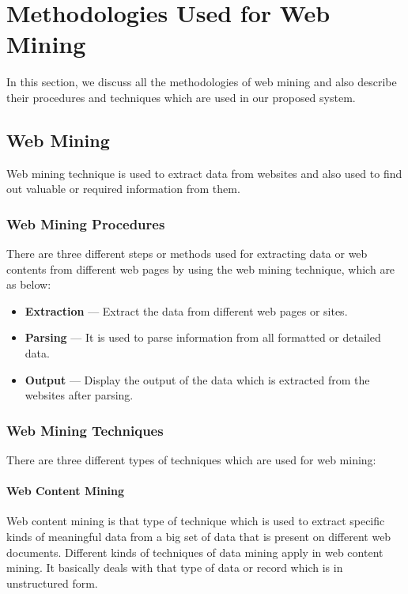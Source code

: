 \section{Methodologies Used for Web Mining}

In this section, we discuss all the methodologies of web mining and also describe their procedures and techniques which are used in our proposed system.

\subsection{Web Mining}

Web mining technique is used to extract data from websites and also used to find out valuable or required information from them.

\subsubsection{Web Mining Procedures}

There are three different steps or methods used for extracting data or web contents from different web pages by using the web mining technique, which are as below:

\begin{itemize}
    \item \textbf{Extraction} --- Extract the data from different web pages or sites.
    \item \textbf{Parsing} --- It is used to parse information from all formatted or detailed data.
    \item \textbf{Output} --- Display the output of the data which is extracted from the websites after parsing.
\end{itemize}

\subsubsection{Web Mining Techniques}

There are three different types of techniques which are used for web mining:

\paragraph{Web Content Mining}

Web content mining is that type of technique which is used to extract specific kinds of meaningful data from a big set of data that is present on different web documents. Different kinds of techniques of data mining apply in web content mining. It basically deals with that type of data or record which is in unstructured form.

